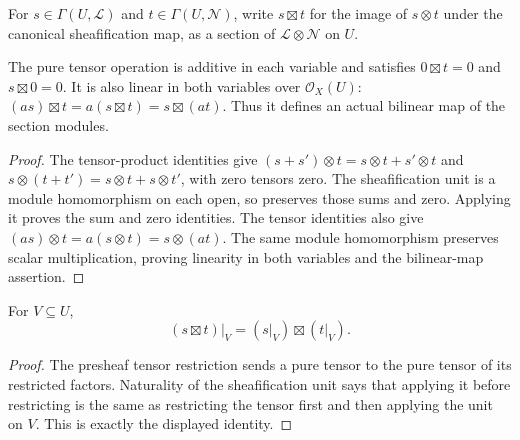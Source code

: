 \begin{definition}
\label{sc0-canonical-port:geom:pure-tensor-sections}
\leanok
For \(s\in\Gamma(U,\mathcal L)\) and
\(t\in\Gamma(U,\mathcal N)\), write \(s\boxtimes t\) for the
image of \(s\otimes t\) under the canonical sheafification map,
as a section of \(\mathcal L\otimes\mathcal N\) on \(U\).
\end{definition}

\begin{lemma}
\label{sc0-canonical-port:geom:tensor-section-bilinearity}
\leanok
The pure tensor operation is additive in each variable and satisfies
\(0\boxtimes t=0\) and \(s\boxtimes0=0\).
It is also linear in both variables over \(\mathcal O_X(U)\):
\((a s)\boxtimes t=a(s\boxtimes t)=s\boxtimes(a t)\).
Thus it defines an actual bilinear map of the section modules.
\end{lemma}
\begin{proof}
The tensor-product identities give
\((s+s')\otimes t=s\otimes t+s'\otimes t\) and
\(s\otimes(t+t')=s\otimes t+s\otimes t'\), with zero tensors
zero. The sheafification unit is a module homomorphism on each
open, so preserves those sums and zero. Applying it proves the
sum and zero identities. The tensor identities also give
\((a s)\otimes t=a(s\otimes t)=s\otimes(a t)\).
The same module homomorphism preserves scalar multiplication,
proving linearity in both variables and the bilinear-map assertion.
\end{proof}

\begin{lemma}
\label{sc0-canonical-port:geom:tensor-section-restriction}
\leanok
For \(V\subseteq U\),
\[
 (s\boxtimes t)|_V=(s|_V)\boxtimes(t|_V).
\]
\end{lemma}
\begin{proof}
The presheaf tensor restriction sends a pure tensor to the pure
tensor of its restricted factors. Naturality of the sheafification
unit says that applying it before restricting is the same as
restricting the tensor first and then applying the unit on \(V\).
This is exactly the displayed identity.
\end{proof}

